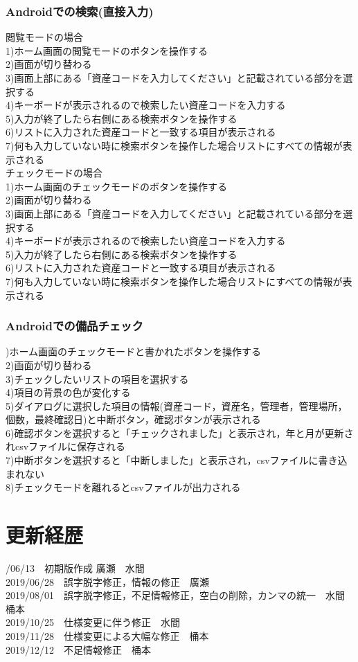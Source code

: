 \documentclass[11pt,a4j]{jarticle}
\begin{document}
\subsubsection{Androidでの検索(直接入力)}
\noindent
{閲覧モードの場合}
\\1)ホーム画面の閲覧モードのボタンを操作する
\\2)画面が切り替わる
\\3)画面上部にある「資産コードを入力してください」と記載されている部分を選択する
\\4)キーボードが表示されるので検索したい資産コードを入力する
\\5)入力が終了したら右側にある検索ボタンを操作する
\\6)リストに入力された資産コードと一致する項目が表示される
\\7)何も入力していない時に検索ボタンを操作した場合リストにすべての情報が表示される
\noindent
\\
{チェックモードの場合}
\\1)ホーム画面のチェックモードのボタンを操作する
\\2)画面が切り替わる
\\3)画面上部にある「資産コードを入力してください」と記載されている部分を選択する
\\4)キーボードが表示されるので検索したい資産コードを入力する
\\5)入力が終了したら右側にある検索ボタンを操作する
\\6)リストに入力された資産コードと一致する項目が表示される
\\7)何も入力していない時に検索ボタンを操作した場合リストにすべての情報が表示される

\subsubsection{Androidでの備品チェック}
)ホーム画面のチェックモードと書かれたボタンを操作する
\\2)画面が切り替わる
\\3)チェックしたいリストの項目を選択する
\\4)項目の背景の色が変化する
\\5)ダイアログに選択した項目の情報(資産コード，資産名，管理者，管理場所，個数，最終確認日)と中断ボタン，確認ボタンが表示される
\\6)確認ボタンを選択すると「チェックされました」と表示され，年と月が更新されcsvファイルに保存される
\\7)中断ボタンを選択すると「中断しました」と表示され，csvファイルに書き込まれない
\\8)チェックモードを離れるとcsvファイルが出力される



  \newpage
  \section{更新経歴}
  /06/13　初期版作成	廣瀬　水間
  \\2019/06/28　誤字脱字修正，情報の修正　廣瀬
  \\2019/08/01　誤字脱字修正，不足情報修正，空白の削除，カンマの統一　水間　桶本
  \\2019/10/25　仕様変更に伴う修正　水間
　\\2019/11/28　仕様変更による大幅な修正　桶本
　\\2019/12/12　不足情報修正　桶本
\end{document}
